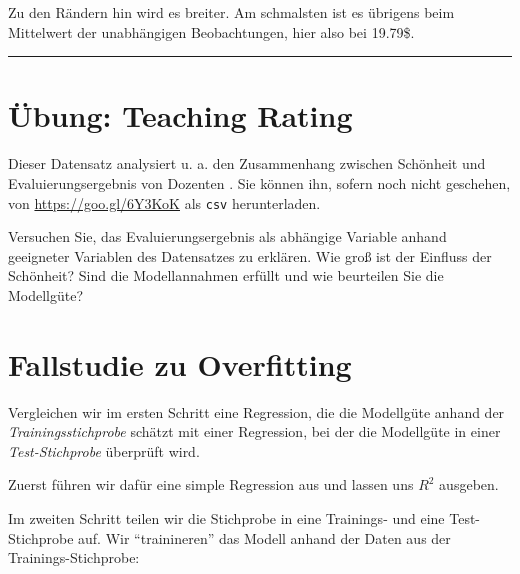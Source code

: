 \documentclass[12pt,ngerman,]{book}
\newenvironment{Shaded}{\begin{snugshade}}{\end{snugshade}}
\newcommand{\KeywordTok}[1]{\textcolor[rgb]{0.13,0.29,0.53}{\textbf{{#1}}}}
\newcommand{\DataTypeTok}[1]{\textcolor[rgb]{0.13,0.29,0.53}{{#1}}}
\newcommand{\StringTok}[1]{\textcolor[rgb]{0.31,0.60,0.02}{{#1}}}
\newcommand{\CommentTok}[1]{\textcolor[rgb]{0.56,0.35,0.01}{\textit{{#1}}}}
\newcommand{\NormalTok}[1]{{#1}}
\renewenvironment{Shaded}{\begin{kframe}}{\end{kframe}}
\begin{document}
Zu den Rändern hin wird es breiter. Am schmalsten ist es übrigens beim
Mittelwert der unabhängigen Beobachtungen, hier also bei 19.79\$.

\begin{center}\rule{0.5\linewidth}{\linethickness}\end{center}

\section{Übung: Teaching Rating}\label{ubung-teaching-rating}

Dieser Datensatz analysiert u. a. den Zusammenhang zwischen Schönheit
und Evaluierungsergebnis von Dozenten \citep{hamermesh2005beauty}. Sie
können ihn, sofern noch nicht geschehen, von \url{https://goo.gl/6Y3KoK}
als \texttt{csv} herunterladen.

Versuchen Sie, das Evaluierungsergebnis als abhängige Variable anhand
geeigneter Variablen des Datensatzes zu erklären. Wie groß ist der
Einfluss der Schönheit? Sind die Modellannahmen erfüllt und wie
beurteilen Sie die Modellgüte?

\section{Fallstudie zu Overfitting}\label{overfitting-casestudy}

Vergleichen wir im ersten Schritt eine Regression, die die Modellgüte
anhand der \emph{Trainingsstichprobe} schätzt mit einer Regression, bei
der die Modellgüte in einer \emph{Test-Stichprobe} überprüft wird.

Zuerst führen wir dafür eine simple Regression aus und lassen uns
\(R^2\) ausgeben.

\begin{Shaded}
\end{Shaded}

Im zweiten Schritt teilen wir die Stichprobe in eine Trainings- und eine
Test-Stichprobe auf. Wir ``trainineren'' das Modell anhand der Daten aus
der Trainings-Stichprobe:
\end{document}
